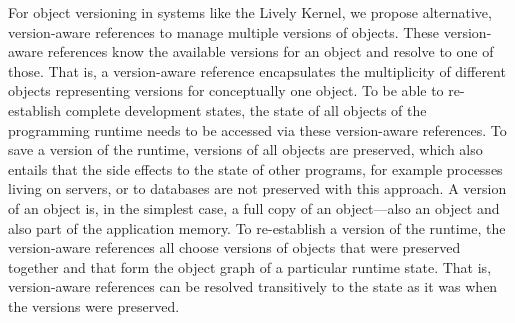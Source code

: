 




For object versioning in systems like the Lively Kernel, we propose alternative, version-aware references to manage multiple versions of objects.
These version-aware references know the available versions for an object and resolve to one of those.
That is, a version-aware reference encapsulates the multiplicity of different objects representing versions for conceptually one object.
To be able to re-establish complete development states, the state of all objects of the programming runtime needs to be accessed via these version-aware references.
To save a version of the runtime, versions of all objects are preserved, which also entails that the side effects to the state of other programs, for example processes living on servers, or to databases are not preserved with this approach.
A version of an object is, in the simplest case, a full copy of an object---also an object and also part of the application memory.
To re-establish a version of the runtime, the version-aware references all choose versions of objects that were preserved together and that form the object graph of a particular runtime state.
That is, version-aware references can be resolved transitively to the state as it was when the versions were preserved.


